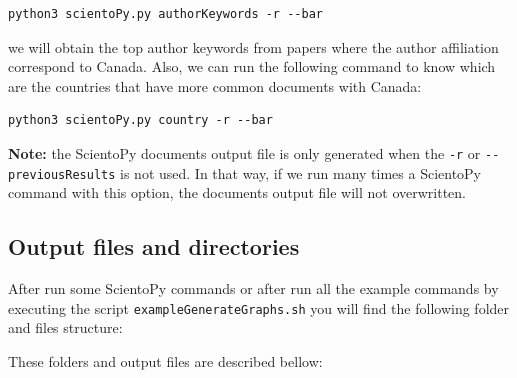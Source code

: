 \documentclass[10pt,letterpaper]{article}
\begin{document}
\begin{verbatim}
python3 scientoPy.py authorKeywords -r --bar
\end{verbatim}

we will obtain the top author keywords from papers where the author affiliation correspond to Canada. Also, we can run the following command to know which are the countries that have more common documents with Canada:

\begin{verbatim}
python3 scientoPy.py country -r --bar
\end{verbatim}

\textbf{Note:} the ScientoPy documents output file is only generated when the \verb|-r| or \verb|--previousResults| is not used. In that way, if we run many times a ScientoPy command with this option, the documents output file will not overwritten.

\subsection{Output files and directories}

After run some ScientoPy commands or after run all the example commands by executing the script \verb|exampleGenerateGraphs.sh| you will find the following folder and files structure:

\vspace*{0.5cm}

These folders and output files are described bellow:
\end{document}
